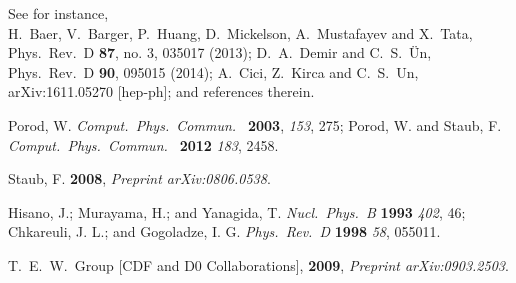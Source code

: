\documentclass[12pt]{article}
\begin{document}
\begin{thebibliography}{99}
 See for instance, \\
  H.~Baer, V.~Barger, P.~Huang, D.~Mickelson, A.~Mustafayev and X.~Tata,
  Phys.\ Rev.\ D {\bf 87}, no. 3, 035017 (2013);
  D.~A.~Demir and C.~S.~Ün,
  Phys.\ Rev.\ D {\bf 90}, 095015 (2014);
  A.~Cici, Z.~Kirca and C.~S.~Un,
  arXiv:1611.05270 [hep-ph]; and references therein.

  Porod, W.
  {\it Comput.\ Phys.\ Commun.\ } {\bf 2003}, {\it 153}, 275;  
  Porod, W. and Staub, F.
  {\it Comput.\ Phys.\ Commun.\ } {\bf 2012} {\it 183}, 2458.

  Staub, F.
{\bf 2008}, {\it Preprint  arXiv:0806.0538}.
  
  Hisano, J.; Murayama, H.; and Yanagida, T.
 {\it Nucl.\ Phys.\ B } {\bf 1993} {\it 402}, 46;
  Chkareuli, J. L.; and Gogoladze, I. G.
 {\it Phys.\ Rev.\ D }{\bf 1998} {\it 58}, 055011.
  
  T.~E.~W.~Group [CDF and D0 Collaborations], {\bf 2009}, {\it Preprint
  arXiv:0903.2503}.
  

\end{thebibliography}
\end{document}
